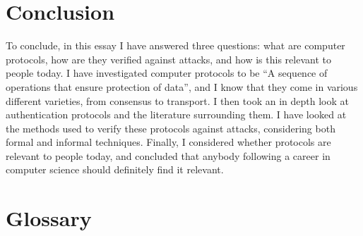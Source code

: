 \documentclass{article}
\begin{document}
\section{Conclusion}
To conclude, in this essay I have answered three questions: what are computer
protocols, how are they verified against attacks, and how is this relevant to
people today. I have investigated computer protocols to be “A sequence of
operations that ensure protection of data”, and I know that they come in various
different varieties, from consensus to transport. I then took an in depth look
at authentication protocols and the literature surrounding them. I have looked
at the methods used to verify these protocols against attacks, considering both
formal and informal techniques. Finally, I considered whether protocols are
relevant to people today, and concluded that anybody following a career in
computer science should definitely find it relevant.

\addtocounter{section}{1}



\nocite{*}

\section{Glossary}
\end{document}
